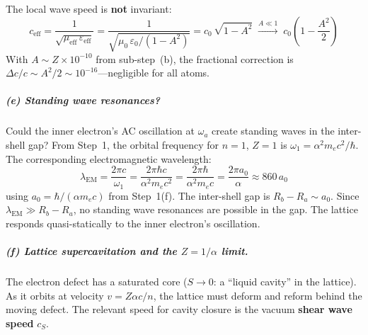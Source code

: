 The local wave speed is \textbf{not} invariant:
\begin{equation}
    c_{\text{eff}}
    = \frac{1}{\sqrt{\mu_{\text{eff}}\,\varepsilon_{\text{eff}}}}
    = \frac{1}{\sqrt{\mu_0\,\varepsilon_0 / (1-A^2)}}
    = c_0\,\sqrt{1 - A^2}
    \;\xrightarrow{A \ll 1}\;
    c_0\!\left(1 - \frac{A^2}{2}\right)
    \label{eq:c_eff}
\end{equation}
With $A \sim Z \times 10^{-10}$ from sub-step~(b),
the fractional correction is
$\Delta c / c \sim A^2/2 \sim 10^{-16}$---negligible
for all atoms.

\subparagraph{(e) Standing wave resonances?}
Could the inner electron's AC oscillation at $\omega_a$ create
standing waves in the inter-shell gap?  From Step~1,
the orbital frequency for $n = 1$, $Z = 1$ is
$\omega_1 = \alpha^2 m_e c^2 / \hbar$.
The corresponding electromagnetic wavelength:
\begin{equation}
    \lambda_{\text{EM}}
    = \frac{2\pi c}{\omega_1}
    = \frac{2\pi \hbar c}{\alpha^2 m_e c^2}
    = \frac{2\pi \hbar}{\alpha^2 m_e c}
    = \frac{2\pi a_0}{\alpha}
    \approx 860\,a_0
\end{equation}
using $a_0 = \hbar / (\alpha m_e c)$ from Step~1(f).
The inter-shell gap is $R_b - R_a \sim a_0$.  Since
$\lambda_{\text{EM}} \gg R_b - R_a$, no standing wave
resonances are possible in the gap.  The lattice responds
quasi-statically to the inner electron's oscillation.
\subparagraph{(f) Lattice supercavitation and the $Z = 1/\alpha$ limit.}

The electron defect has a saturated core ($S \to 0$:
a ``liquid cavity'' in the lattice).  As it orbits at velocity
$v = Z\alpha c / n$, the lattice must deform and reform behind
the moving defect.  The relevant speed for cavity closure is the vacuum
\textbf{shear wave speed} $c_S$.

